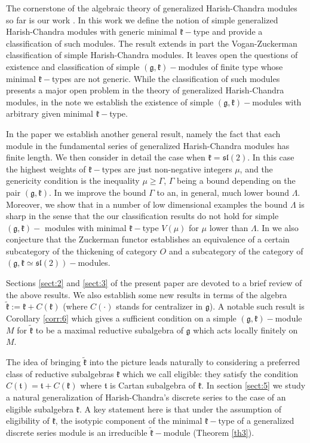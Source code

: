 \documentclass[default]{./styles/svmult}
\renewcommand{\gg}{\mathfrak{g}}
\newcommand{\kk}{\mathfrak{k}}
\renewcommand{\tt}{\mathfrak{t}}
\renewcommand{\sl}{\mathfrak{sl}}
\begin{document}
The cornerstone of the algebraic theory of generalized Harish-Chandra modules so far is our work \cite{PZ2}. In this work we define the notion of simple generalized Harish-Chandra modules with generic minimal $\kk-$type and provide a classification of such modules. The result extends in part the Vogan-Zuckerman classification of simple Harish-Chandra modules. It leaves open the questions of existence and classification of simple $(\gg,\kk)-$modules of finite type whose minimal $\kk-$types are not generic. While the classification of such modules presents a major open problem in the theory of generalized Harish-Chandra modules, in the note \cite{PZ3} we establish the existence of simple $(\gg,\kk)-$modules with arbitrary given minimal $\kk-$type.

In the paper \cite{PZ5} we establish another general result, namely the fact that each module in the fundamental series of generalized Harish-Chandra modules has finite length. We then consider in detail the case when $\kk=\sl(2)$. In this case the highest weights of $\kk-$types are just non-negative integers $\mu$, and the genericity condition is the inequality $\mu \geq \Gamma$, $\Gamma$ being a bound depending on the pair $(\gg,\kk)$. In \cite{PZ5} we improve the bound $\Gamma$ to an, in general, much lower bound $\Lambda$. Moreover, we show that in a number of low dimensional examples the bound $\Lambda$ is sharp in the sense that the our classification results do not hold for simple $(\gg,\kk)-$ modules with minimal $\kk-$type $V(\mu)$ for $\mu$ lower than $\Lambda$. In \cite{PZ5} we also conjecture that the Zuckerman functor establishes an equivalence of a certain subcategory of the thickening of category $O$ and a subcategory of the category of $(\gg,\kk \simeq \sl(2))-$modules. 

Sections \ref{sect:2} and \ref{sect:3} of the present paper are devoted to a brief review of the above results. We also establish some new results in terms of the algebra $\tilde{\kk} := \kk+C(\kk)$ (where $C(\cdot)$ stands for centralizer in $\gg$). A notable such result is Corollary \ref{corr:6} which gives a sufficient condition on a simple $(\gg,\kk)-$module $M$ for $\tilde{\kk}$ to be a maximal reductive subalgebra of $\gg$ which acts locally finitely on $M$. 

The idea of bringing $\tilde{\kk}$ into the picture leads naturally to considering a preferred class of reductive subalgebras $\kk$ which we call eligible: they satisfy the condition $C(\tt) = \tt+C(\kk)$ where $\tt$ is Cartan subalgebra of $\kk$. In section \ref{sect:5} we study a natural generalization of Harish-Chandra's discrete series to the case of an eligible subalgebra $\kk$. A key statement here is that under the assumption of eligibility of $\kk$, the isotypic component of the minimal $\kk-$type of a generalized discrete series module is an irreducible $\tilde{\kk}-$module (Theorem \ref{th3}).
 
\end{document}
